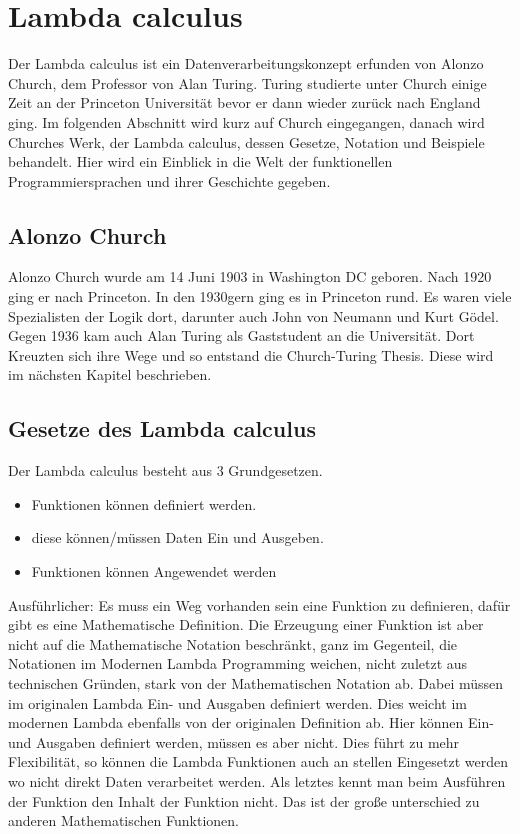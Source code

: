 \section{Lambda calculus}
Der Lambda calculus ist ein Datenverarbeitungskonzept erfunden von Alonzo Church, dem Professor von Alan Turing. Turing studierte unter Church einige Zeit an der Princeton Universität bevor er dann wieder zurück nach England ging. Im folgenden Abschnitt wird kurz auf Church eingegangen, danach wird Churches Werk, der Lambda calculus, dessen Gesetze, Notation und Beispiele behandelt. Hier wird ein Einblick in die Welt der funktionellen Programmiersprachen und ihrer Geschichte gegeben.
\subsection{Alonzo Church}
Alonzo Church wurde am 14 Juni 1903 in Washington DC geboren. \cite{lifechurch}
Nach 1920 ging er nach Princeton. In den 1930gern ging es in Princeton rund. Es waren viele Spezialisten der Logik dort, darunter auch John von Neumann und Kurt Gödel. Gegen 1936 kam auch Alan Turing als Gaststudent an die Universität. Dort Kreuzten sich ihre Wege und so entstand die Church-Turing Thesis. Diese wird im nächsten Kapitel beschrieben.
\subsection{Gesetze des Lambda calculus}
Der Lambda calculus besteht aus 3 Grundgesetzen.
\begin{itemize}
\item Funktionen können definiert werden.
\item diese können/müssen Daten Ein und Ausgeben.
\item Funktionen können Angewendet werden
\end{itemize}
Ausführlicher: Es muss ein Weg vorhanden sein eine Funktion zu definieren, dafür gibt es eine Mathematische Definition. Die Erzeugung einer Funktion ist aber nicht auf die Mathematische Notation beschränkt, ganz im Gegenteil, die Notationen im Modernen Lambda Programming weichen, nicht zuletzt aus technischen Gründen, stark von der Mathematischen Notation ab. Dabei müssen im originalen Lambda Ein- und Ausgaben definiert werden. Dies weicht im modernen Lambda ebenfalls von der originalen Definition ab. Hier können Ein- und Ausgaben definiert werden, müssen es aber nicht. Dies führt zu mehr Flexibilität, so können die Lambda Funktionen auch an stellen Eingesetzt werden wo nicht direkt Daten verarbeitet werden. Als letztes kennt man beim Ausführen der Funktion den Inhalt der Funktion nicht. Das ist der große unterschied zu anderen Mathematischen Funktionen.\cite{lambdacalculus}

